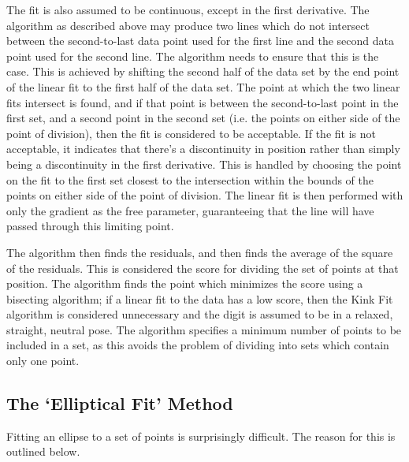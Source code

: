 The fit is also assumed to be continuous, except in the first derivative. The algorithm as described above may produce two lines which do not intersect between the second-to-last data point used for the first line and the second data point used for the second line. The algorithm needs to ensure that this is the case. This is achieved by shifting the second half of the data set by the end point of the linear fit to the first half of the data set. The point at which the two linear fits intersect is found, and if that point is between the second-to-last point in the first set, and a second point in the second set (i.e. the points on either side of the point of division), then the fit is considered to be acceptable. If the fit is not acceptable, it indicates that there's a discontinuity in position rather than simply being a discontinuity in the first derivative. This is handled by choosing the point on the fit to the first set closest to the intersection within the bounds of the points on either side of the point of division. The linear fit is then performed with only the gradient as the free parameter, guaranteeing that the line will have passed through this limiting point.

The algorithm then finds the residuals, and then finds the average of the square of the residuals. This is considered the score for dividing the set of points at that position. The algorithm finds the point which minimizes the score using a bisecting algorithm; if a linear fit to the data has a low score, then the Kink Fit algorithm is considered unnecessary and the digit is assumed to be in a relaxed, straight, neutral pose. The algorithm specifies a minimum number of points to be included in a set, as this avoids the problem of dividing into sets which contain only one point.

\subsection{The `Elliptical Fit' Method}\label{sec:EllipticalFitMethod}
Fitting an ellipse to a set of points is surprisingly difficult. The reason for this is outlined below.

